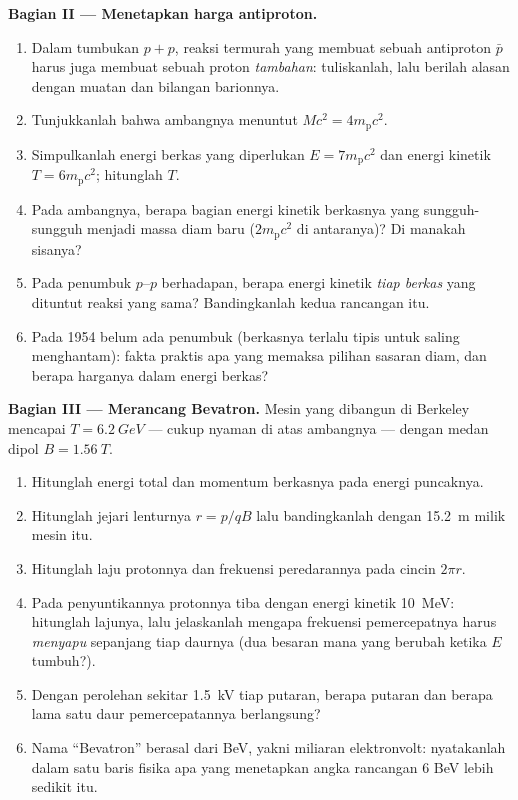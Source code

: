 \begin{problem}
\medskip\noindent\textbf{Bagian II --- Menetapkan harga antiproton.}
\begin{enumerate}[resume]
  \item Dalam tumbukan $p + p$, reaksi termurah yang membuat sebuah
        antiproton $\bar p$ harus juga membuat sebuah proton
        \emph{tambahan}: tuliskanlah, lalu berilah alasan dengan muatan
        dan bilangan barionnya.
  \item Tunjukkanlah bahwa ambangnya menuntut $Mc^2 = 4m_{\text{p}}c^2$.
  \item Simpulkanlah energi berkas yang diperlukan $E = 7m_{\text{p}}c^2$
        dan energi kinetik $T = 6m_{\text{p}}c^2$; hitunglah $T$.
  \item Pada ambangnya, berapa bagian energi kinetik berkasnya yang
        sungguh-sungguh menjadi massa diam baru ($2m_{\text{p}}c^2$
        di antaranya)? Di manakah sisanya?
  \item Pada penumbuk $p$--$p$ berhadapan, berapa energi kinetik
        \emph{tiap berkas} yang dituntut reaksi yang sama?
        Bandingkanlah kedua rancangan itu.
  \item Pada 1954 belum ada penumbuk (berkasnya terlalu tipis untuk
        saling menghantam): fakta praktis apa yang memaksa pilihan
        sasaran diam, dan berapa harganya dalam energi berkas?
\end{enumerate}

\medskip\noindent\textbf{Bagian III --- Merancang Bevatron.}
Mesin yang dibangun di Berkeley mencapai $T = \qty{6.2}{GeV}$ ---
cukup nyaman di atas ambangnya --- dengan medan dipol $B =
\qty{1.56}{T}$.
\begin{enumerate}[resume]
  \item Hitunglah energi total dan momentum berkasnya pada energi
        puncaknya.
  \item Hitunglah jejari lenturnya $r = p/qB$ lalu bandingkanlah dengan
        \qty{15.2}{m} milik mesin itu.
  \item Hitunglah laju protonnya dan frekuensi peredarannya pada cincin
        $2\pi r$.
  \item Pada penyuntikannya protonnya tiba dengan energi kinetik
        \qty{10}{MeV}: hitunglah lajunya, lalu jelaskanlah mengapa
        frekuensi pemercepatnya harus \emph{menyapu} sepanjang tiap
        daurnya (dua besaran mana yang berubah ketika $E$ tumbuh?).
  \item Dengan perolehan sekitar \qty{1.5}{kV} tiap putaran, berapa
        putaran dan berapa lama satu daur pemercepatannya berlangsung?
  \item Nama ``Bevatron'' berasal dari BeV, yakni miliaran
        elektronvolt: nyatakanlah dalam satu baris fisika apa yang
        menetapkan angka rancangan $6$ BeV lebih sedikit itu.
\end{enumerate}


\end{problem}
